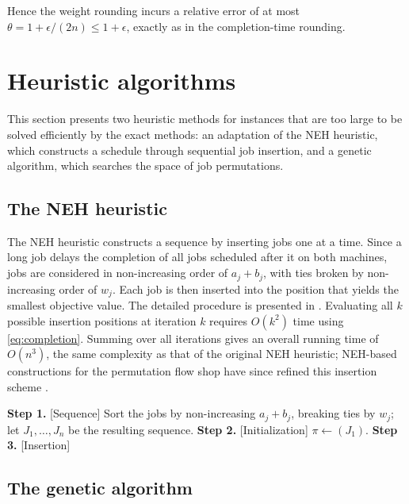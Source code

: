 ﻿\documentclass[12pt]{article}
\let\origsection\section
\renewcommand{\section}{\FloatBarrier\origsection}
\begin{document}
\begin{sloppypar}
Hence the weight rounding incurs
a relative error of at most $\theta=1+\epsilon/(2n)\le 1+\epsilon$, exactly as in the
completion-time rounding.

\section{Heuristic algorithms}
\label{sec:heuristics}

This section presents two heuristic methods for instances that are too large to be solved efficiently 
by the exact methods: an adaptation of the NEH heuristic, which constructs a schedule through sequential job insertion, 
and a genetic algorithm, which searches the space of job permutations.

\subsection{The NEH heuristic}
The NEH heuristic constructs a sequence by inserting jobs one at a time. 
Since a long job delays the completion of all jobs scheduled after it on both machines, 
jobs are considered in non-increasing order of \(a_j+b_j\), with ties broken by non-increasing order of \(w_j\). 
Each job is then inserted into the position that yields the smallest objective value. 
The detailed procedure is presented in . 
Evaluating all \(k\) possible insertion positions at iteration \(k\) requires \(O(k^2)\) time using \cref{eq:completion}. 
Summing over all iterations gives an overall running time of \(O(n^3)\),
the same complexity as that of the original NEH heuristic; NEH-based constructions for the permutation
flow shop have since refined this insertion scheme \citep{puka2024deterministic}.

\begin{algorithm}[H]
\small
\linespread{1.2}\selectfont
\SetAlgoLined
\DontPrintSemicolon
\caption{NEH heuristic for $F2 \parallel WC_{\max}$}\label{alg:neh}
\BlankLine
\textbf{Step 1.} [Sequence] Sort the jobs by non-increasing $a_j+b_j$, breaking ties by $w_j$; 
let $J_{1},\dots,J_{n}$ be the resulting sequence. \;
\textbf{Step 2.} [Initialization] $\pi\gets(J_{1})$. \;
\textbf{Step 3.} [Insertion] 
\end{algorithm}

\subsection{The genetic algorithm}
\label{sub:ga}


\end{sloppypar}
\end{document}
